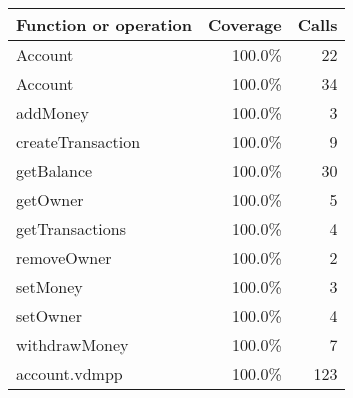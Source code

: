 \documentclass[a4paper]{article}
\begin{document}
\bigskip
\begin{longtable}{|l|r|r|}
\hline
Function or operation & Coverage & Calls \\
\hline
\hline
Account & 100.0\% & 22 \\
\hline
Account & 100.0\% & 34 \\
\hline
addMoney & 100.0\% & 3 \\
\hline
createTransaction & 100.0\% & 9 \\
\hline
getBalance & 100.0\% & 30 \\
\hline
getOwner & 100.0\% & 5 \\
\hline
getTransactions & 100.0\% & 4 \\
\hline
removeOwner & 100.0\% & 2 \\
\hline
setMoney & 100.0\% & 3 \\
\hline
setOwner & 100.0\% & 4 \\
\hline
withdrawMoney & 100.0\% & 7 \\
\hline
\hline
account.vdmpp & 100.0\% & 123 \\
\hline
\end{longtable}
\end{document}
